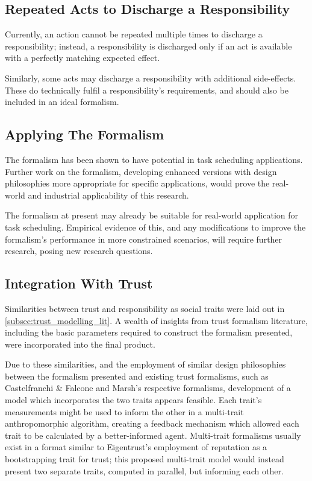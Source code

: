 \subsection{Repeated Acts to Discharge a Responsibility}
Currently, an action cannot be repeated multiple times to discharge a responsibility; instead, a responsibility is discharged only if an act is available with a perfectly matching expected effect.\par

Similarly, some acts may discharge a responsibility with additional side-effects. These do technically fulfil a responsibility's requirements, and should also be included in an ideal formalism.\par

\subsection{Applying The Formalism}
The formalism has been shown to have potential in task scheduling applications. Further work on the formalism, developing enhanced versions with design philosophies more appropriate for specific applications, would prove the real-world and industrial applicability of this research.\par

The formalism at present may already be suitable for real-world application for task scheduling. Empirical evidence of this, and any modifications to improve the formalism's performance in more constrained scenarios, will require further research, posing new research questions.\par

\subsection{Integration With Trust}\label{subsec:multi-trait}
Similarities between trust and responsibility as social traits were laid out in \cref{subsec:trust_modelling_lit}. A wealth of insights from trust formalism literature, including the basic parameters required to construct the formalism presented, were incorporated into the final product.\par

Due to these similarities, and the employment of similar design philosophies between the formalism presented and existing trust formalisms, such as Castelfranchi \& Falcone and Marsh's respective formalisms, development of a model which incorporates the two traits appears feasible. Each trait's measurements might be used to inform the other in a multi-trait anthropomorphic algorithm, creating a feedback mechanism which allowed each trait to be calculated by a better-informed agent. Multi-trait formalisms usually exist in a format similar to Eigentrust's employment of reputation as a bootstrapping trait for trust; this proposed multi-trait model would instead present two separate traits, computed in parallel, but informing each other.\par

